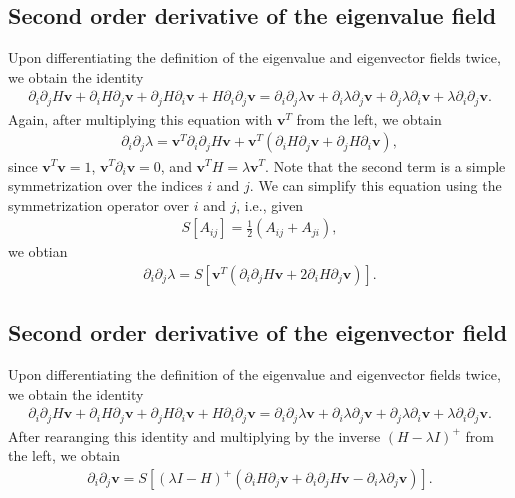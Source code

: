 \documentclass{article}
\begin{document}
\subsection{Second order derivative of the eigenvalue field}
Upon differentiating the definition of the eigenvalue and eigenvector fields twice, we obtain the identity 
\begin{align}
\partial_i \partial_j H \bm{v} + \partial_i H \partial_j \bm{v} + \partial_j H \partial_i \bm{v} + H \partial_i \partial_j \bm{v}
= \partial_i \partial_j \lambda \bm{v} + \partial_i \lambda \partial_j \bm{v}+ \partial_j \lambda \partial_i \bm{v} + \lambda \partial_i \partial_j \bm{v}.
\end{align}
Again, after multiplying this equation with $\bm{v}^T$ from the left, we obtain
\begin{align}
\partial_i \partial_j \lambda 
=
\bm{v}^T\partial_i \partial_j H \bm{v} + \bm{v}^T (\partial_i H \partial_j \bm{v} + \partial_j H \partial_i \bm{v} ),
\end{align}
since $\bm{v}^T\bm{v}=1$, $\bm{v}^T \partial_i \bm{v}=0$, and $\bm{v}^TH=\lambda \bm{v}^T$. Note that the second term is a simple symmetrization over the indices $i$ and $j$. We can simplify this equation using the symmetrization operator over $i$ and $j$, i.e., given
\begin{align}
S[A_{ij}]=\frac{1}{2}(A_{ij}+A_{ji}),
\end{align}
we obtian
\begin{align}
\partial_i \partial_j \lambda = S[\bm{v}^T (\partial_i \partial_j H \bm{v} + 2 \partial_i H \partial_j \bm{v})].
\end{align}

\subsection{Second order derivative of the eigenvector field}
Upon differentiating the definition of the eigenvalue and eigenvector fields twice, we obtain the identity 
\begin{align}
\partial_i \partial_j H \bm{v} + \partial_i H \partial_j \bm{v} + \partial_j H \partial_i \bm{v} + H \partial_i \partial_j \bm{v}
= \partial_i \partial_j \lambda \bm{v} + \partial_i \lambda \partial_j \bm{v}+ \partial_j \lambda \partial_i \bm{v} + \lambda \partial_i \partial_j \bm{v}.
\end{align}
After rearanging this identity and multiplying by the inverse $(H-\lambda I)^+$ from the left, we obtain
\begin{align}
\partial_i \partial_j \bm{v} = S[(\lambda I - H)^+ ( \partial_i H \partial_j \bm{v} + \partial_i \partial_j H \bm{v} - \partial_i \lambda \partial_j \bm{v})].
\end{align}
\end{document}
